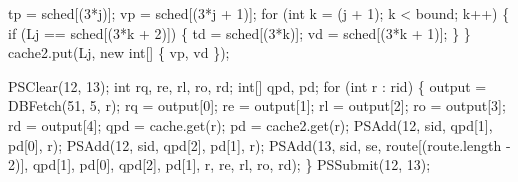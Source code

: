 \documentclass{article}
\def\nwendcode{\endtrivlist \endgroup}
\let\nwdocspar=\par
\theoremstyle{definition}
\begin{document}
\nwenddocs{}\endmoddef{}
tp = sched[(3*j)];
vp = sched[(3*j + 1)];
for (int k = (j + 1); k < bound; k++) \{
  if (Lj == sched[(3*k + 2)]) \{
    td = sched[(3*k)];
    vd = sched[(3*k + 1)];
  \}
\}
cache2.put(Lj, new int[] \{ vp, vd \});
\nwendcode{}\nwdocspar
\nwenddocs{}\endmoddef{}
PSClear(12, 13);
int rq, re, rl, ro, rd;
int[] qpd, pd;
for (int r : rid) \{
  output = DBFetch(51, 5, r);
  rq = output[0];
  re = output[1];
  rl = output[2];
  ro = output[3];
  rd = output[4];
  qpd = cache.get(r);
  pd = cache2.get(r);
  PSAdd(12, sid, qpd[1], pd[0], r);
  PSAdd(12, sid, qpd[2], pd[1], r);
  PSAdd(13, sid, se, route[(route.length - 2)], qpd[1], pd[0], qpd[2], pd[1],
        r, re, rl, ro, rd);
\}
PSSubmit(12, 13);
\nwendcode{}\nwdocspar
\end{document}
